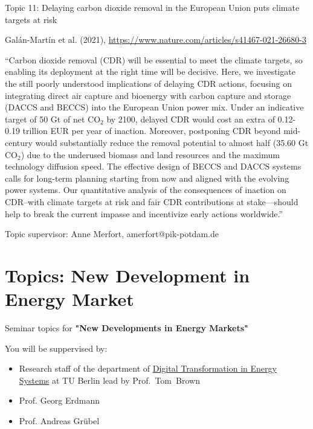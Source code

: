 \documentclass[10pt,aspectratio=169,dvipsnames]{beamer}
\begin{document}
\begin{frame}
  \begin{block}{Topic 11: Delaying carbon dioxide removal in the European Union puts climate targets at risk}
      
    Galán-Martín et al. (2021), \href{https://www.nature.com/articles/s41467-021-26680-3}{https://www.nature.com/articles/s41467-021-26680-3}
    
    \enquote{Carbon dioxide removal (CDR) will be essential to meet the climate targets, so enabling its deployment at the right time will be decisive. Here, we investigate the still poorly understood implications of delaying CDR actions, focusing on integrating direct air capture and bioenergy with carbon capture and storage (DACCS and BECCS) into the European Union power mix. Under an indicative target of 50 Gt of net CO$_2$ by 2100, delayed CDR would cost an extra of 0.12-0.19 trillion EUR per year of inaction. Moreover, postponing CDR beyond mid-century would substantially reduce the removal potential to almost half (35.60 Gt CO$_2$) due to the underused biomass and land resources and the maximum technology diffusion speed. The effective design of BECCS and DACCS systems calls for long-term planning starting from now and aligned with the evolving power systems. Our quantitative analysis of the consequences of inaction on CDR--with climate targets at risk and fair CDR contributions at stake—should help to break the current impasse and incentivize early actions worldwide.}

    \hfill
    Topic supervisor:  Anne Merfort, amerfort@pik-potdam.de
    
  \end{block}
\end{frame}



\section{Topics: New Development in Energy Market}

\begin{frame}
Seminar topics for {\bf "New Developments in Energy Markets"}

You will be suppervised by:  
    \begin{itemize}
        \item  Research staff of the department of \href{https://www.ensys.tu-berlin.de/menue/overview/}{Digital Transformation in Energy Systems} at TU Berlin lead by Prof.~Tom~Brown
        \item Prof. Georg Erdmann
        \item Prof. Andreas Grübel
    \end{itemize}
\end{frame}
\end{document}
